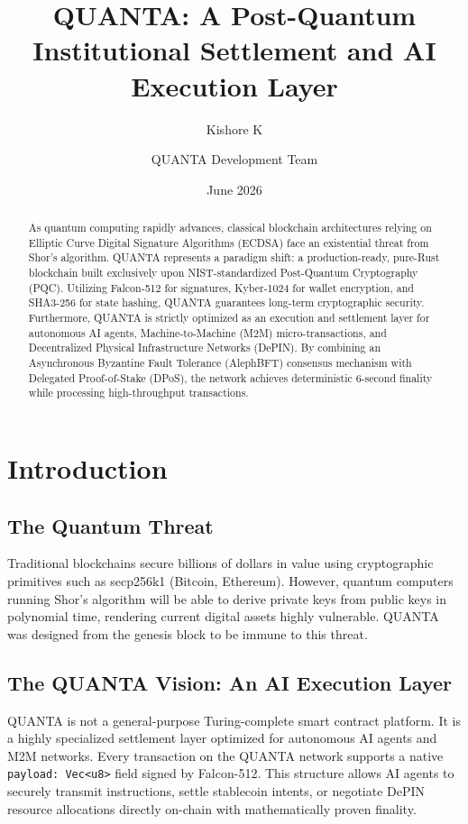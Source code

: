 \documentclass[11pt,a4paper]{article}
\title{\textbf{QUANTA: A Post-Quantum Institutional Settlement and AI Execution Layer}}
\author{Kishore K \and QUANTA Development Team}
\date{June 2026}
\begin{document}
\maketitle

\begin{abstract}
As quantum computing rapidly advances, classical blockchain architectures relying on Elliptic Curve Digital Signature Algorithms (ECDSA) face an existential threat from Shor's algorithm. QUANTA represents a paradigm shift: a production-ready, pure-Rust blockchain built exclusively upon NIST-standardized Post-Quantum Cryptography (PQC). Utilizing Falcon-512 for signatures, Kyber-1024 for wallet encryption, and SHA3-256 for state hashing, QUANTA guarantees long-term cryptographic security. Furthermore, QUANTA is strictly optimized as an execution and settlement layer for autonomous AI agents, Machine-to-Machine (M2M) micro-transactions, and Decentralized Physical Infrastructure Networks (DePIN). By combining an Asynchronous Byzantine Fault Tolerance (AlephBFT) consensus mechanism with Delegated Proof-of-Stake (DPoS), the network achieves deterministic 6-second finality while processing high-throughput transactions.
\end{abstract}

\tableofcontents
\newpage

\section{Introduction}
\subsection{The Quantum Threat}
Traditional blockchains secure billions of dollars in value using cryptographic primitives such as secp256k1 (Bitcoin, Ethereum). However, quantum computers running Shor's algorithm will be able to derive private keys from public keys in polynomial time, rendering current digital assets highly vulnerable. QUANTA was designed from the genesis block to be immune to this threat.

\subsection{The QUANTA Vision: An AI Execution Layer}
QUANTA is not a general-purpose Turing-complete smart contract platform. It is a highly specialized settlement layer optimized for autonomous AI agents and M2M networks. Every transaction on the QUANTA network supports a native \texttt{payload: Vec<u8>} field signed by Falcon-512. This structure allows AI agents to securely transmit instructions, settle stablecoin intents, or negotiate DePIN resource allocations directly on-chain with mathematically proven finality.
\end{document}
